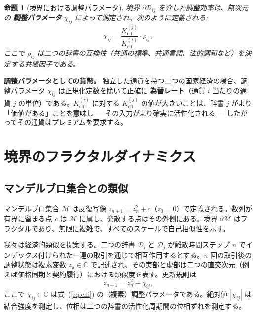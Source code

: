 \documentclass[12pt,a4paper]{article}
\newtheorem{proposition}[theorem]{命題}
\theoremstyle{remark}
\begin{document}
	\begin{proposition}[境界における調整パラメータ]
		境界 \(\partial\mathcal{D}_{ij}\) を介した調整効率は、無次元の \textbf{調整パラメータ} \(\chi_{ij}\) によって測定され、次のように定義される:
		\begin{equation}
			\chi_{ij} = \frac{K_{\mathrm{eff}}^{(j)}}{K_{\mathrm{eff}}^{(i)}} \cdot \rho_{ij},
			\label{eq:chi}
		\end{equation}
		ここで \(\rho_{ij}\) は二つの辞書の互換性（共通の標準、共通言語、法的調和など）を決定する共鳴因子である。
	\end{proposition}
	
	\textbf{調整パラメータとしての貨幣。} 独立した通貨を持つ二つの国家経済の場合、調整パラメータ \(\chi_{ij}\) は正規化定数を除いて正確に \textbf{為替レート}（通貨 \(i\) 当たりの通貨 \(j\) の単位）である。\(K_{\mathrm{eff}}^{(i)}\) に対する \(K_{\mathrm{eff}}^{(j)}\) の値が大きいことは、辞書 \(j\) がより「価値がある」ことを意味し — その入力がより確実に活性化される — したがってその通貨はプレミアムを要求する。
	
	\section{境界のフラクタルダイナミクス}
	
	\subsection{マンデルブロ集合との類似}
	
	マンデルブロ集合 \(\mathcal{M}\) は反復写像 \(z_{n+1} = z_n^2 + c\)（\(z_0 = 0\)）で定義される。数列が有界に留まる点 \(c\) は \(\mathcal{M}\) に属し、発散する点はその外側にある。境界 \(\partial\mathcal{M}\) はフラクタルであり、無限に複雑で、すべてのスケールで自己相似性を示す。
	
	我々は経済的類似を提案する。二つの辞書 \(\mathcal{D}_i\) と \(\mathcal{D}_j\) が離散時間ステップ \(n\) でインデックス付けられた一連の取引を通じて相互作用するとする。\(n\) 回の取引後の調整状態は複素変数 \(z_n \in \mathbb{C}\) で記述され、その実部と虚部は二つの直交次元（例えば価格同期と契約履行）における類似度を表す。更新規則は
	\begin{equation}
		z_{n+1} = z_n^2 + \chi_{ij},
		\label{eq:mandel_econ}
	\end{equation}
	ここで \(\chi_{ij} \in \mathbb{C}\) は式~(\ref{eq:chi}) の（複素）調整パラメータである。絶対値 \(|\chi_{ij}|\) は結合強度を測定し、位相は二つの辞書の活性化周期間の位相ずれを測定する。
	
\end{document}
